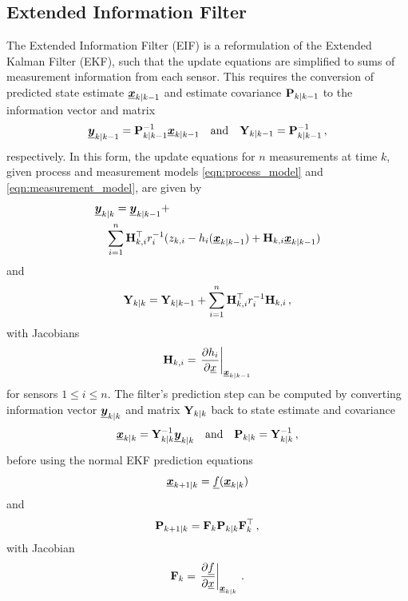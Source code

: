 \documentclass[10pt,letterpaper,oneside,twocolumn,journal]{IEEEtran}
\theoremstyle{definition}
\theoremstyle{definition}
\theoremstyle{remark}
\begin{document}
\subsection{Extended Information Filter}
The Extended Information Filter (EIF) \cite{maybeckStochasticModelsEstimation1982} is a reformulation of the Extended Kalman Filter (EKF), such that the update equations are simplified to sums of measurement information from each sensor. This requires the conversion of predicted state estimate ${\boldsymbol{\underline{x}}}_{k|k-1}$ and estimate covariance ${{\mathbf{P}}}_{k|k-1}$ to the information vector and matrix
\begin{equation}
    {\boldsymbol{\underline{y}}}_{k|k-1} = {{\mathbf{P}}}_{k|k-1}^{-1}{\boldsymbol{\underline{x}}}_{k|k-1} \quad\textrm{and}\quad {\ensuremath{{\mathbf{Y}}}}_{k|k-1} = {{\mathbf{P}}}_{k|k-1}^{-1}\,,
\end{equation}
respectively. In this form, the update equations for $n$ measurements at time $k$, given process and measurement models \eqref{eqn:process_model} and \eqref{eqn:measurement_model}, are given by
\begin{equation}
    \begin{split}
        &\rvec{y}_{k|k} = \rvec{y}_{k|k-1} + \\
        &\quad \sum^n_{i=1}\mat{H}^\top_{k,i} r^{-1}_i (z_{k,i} - h_i(\rvec{x}_{k|k-1}) + \mat{H}_{k,i}\rvec{x}_{k|k-1})
    \end{split} \label{eqn:eif_info_vec_update}
\end{equation}
and
\begin{equation}
    \mat{Y}_{k|k} = \mat{Y}_{k|k-1} + \sum^n_{i=1}\mat{H}^\top_{k,i} r^{-1}_i \mat{H}_{k,i}\,, \label{eqn:eif_info_mat_update}
\end{equation}
with Jacobians
\begin{equation}
    \mat{H}_{k,i} = \left.\frac{\partial h_i}{\partial \vec{x}}\right|_{\rvec{x}_{k|k-1}} \label{eqn:measurement_jacobian}
\end{equation}
for sensors $1 \leq i \leq n$. The filter's prediction step can be computed by converting information vector ${\boldsymbol{\underline{y}}}_{k|k}$ and matrix ${{\mathbf{Y}}}_{k|k}$ back to state estimate and covariance 
\begin{equation}
    {\boldsymbol{\underline{x}}}_{k|k} = {{\mathbf{Y}}}_{k|k}^{-1}{\boldsymbol{\underline{y}}}_{k|k} \quad\textrm{and}\quad {\ensuremath{{\mathbf{P}}}}_{k|k} = {{\mathbf{Y}}}_{k|k}^{-1}\,,
\end{equation}
before using the normal EKF prediction equations
\begin{equation}
    {\boldsymbol{\underline{x}}}_{k+1|k} = {\underline{f}}({\boldsymbol{\underline{x}}}_{k|k})
\end{equation}
and
\begin{equation}
    {\ensuremath{{\mathbf{P}}}}_{k+1|k} = {{\mathbf{F}}}_k{{\mathbf{P}}}_{k|k}{{\mathbf{F}}}_k^\top\,,
\end{equation}
with Jacobian
\begin{equation}
    \mat{F}_{k} = \left.\frac{\partial \vec{f}}{\partial \vec{x}}\right|_{\rvec{x}_{k|k}}\,. \label{eqn:jacobian_f}
\end{equation}
\end{document}
